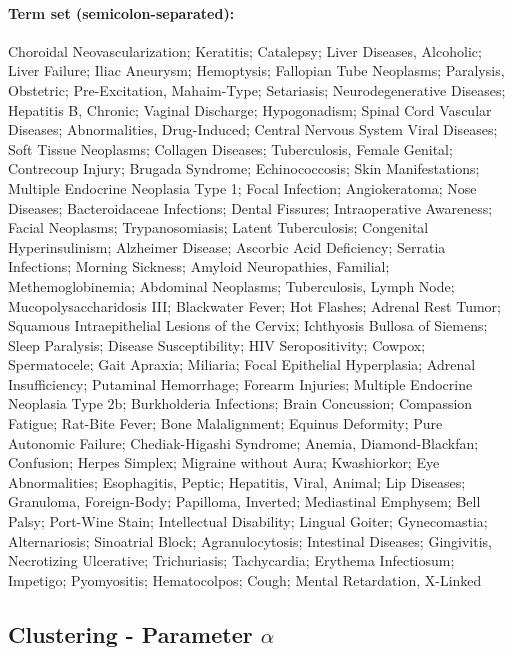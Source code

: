 \paragraph{Term set (semicolon-separated):}$ $\\
Choroidal Neovascularization; Keratitis; Catalepsy; Liver Diseases, Alcoholic; Liver Failure; Iliac Aneurysm; Hemoptysis; Fallopian Tube Neoplasms;
Paralysis, Obstetric; Pre-Excitation, Mahaim-Type; Setariasis; Neurodegenerative Diseases; Hepatitis B, Chronic; Vaginal Discharge; Hypogonadism;
Spinal Cord Vascular Diseases; Abnormalities, Drug-Induced; Central Nervous System Viral Diseases; Soft Tissue Neoplasms; Collagen Diseases; 
Tuberculosis, Female Genital; Contrecoup Injury; Brugada Syndrome; Echinococcosis; Skin Manifestations; Multiple Endocrine Neoplasia Type 1; 
Focal Infection; Angiokeratoma; Nose Diseases; Bacteroidaceae Infections; Dental Fissures; Intraoperative Awareness; Facial Neoplasms; Trypanosomiasis;
Latent Tuberculosis; Congenital Hyperinsulinism; Alzheimer Disease; Ascorbic Acid Deficiency; Serratia Infections; Morning Sickness; 
Amyloid Neuropathies, Familial; Methemoglobinemia; Abdominal Neoplasms; Tuberculosis, Lymph Node; Mucopolysaccharidosis III; Blackwater Fever; Hot Flashes;
Adrenal Rest Tumor; Squamous Intraepithelial Lesions of the Cervix; Ichthyosis Bullosa of Siemens; Sleep Paralysis; Disease Susceptibility; 
HIV Seropositivity; Cowpox; Spermatocele; Gait Apraxia; Miliaria; Focal Epithelial Hyperplasia; Adrenal Insufficiency; Putaminal Hemorrhage; 
Forearm Injuries; Multiple Endocrine Neoplasia Type 2b; Burkholderia Infections; Brain Concussion; Compassion Fatigue; Rat-Bite Fever; Bone Malalignment;
Equinus Deformity; Pure Autonomic Failure; Chediak-Higashi Syndrome; Anemia, Diamond-Blackfan; Confusion; Herpes Simplex; Migraine without Aura;
Kwashiorkor; Eye Abnormalities; Esophagitis, Peptic; Hepatitis, Viral, Animal; Lip Diseases; Granuloma, Foreign-Body; Papilloma, Inverted; 
Mediastinal Emphysem; Bell Palsy; Port-Wine Stain; Intellectual Disability; Lingual Goiter; Gynecomastia; Alternariosis; Sinoatrial Block; Agranulocytosis;
Intestinal Diseases; Gingivitis, Necrotizing Ulcerative; Trichuriasis; Tachycardia; Erythema Infectiosum; Impetigo; Pyomyositis; Hematocolpos; Cough;
Mental Retardation, X-Linked

\subsection{Clustering - Parameter $\alpha$}
\label{app:alpha}

